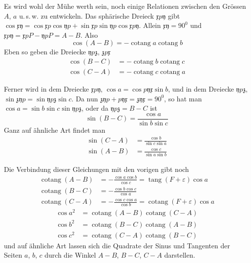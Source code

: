 %
Es wird wohl der Mühe werth sein, noch einige Relationen zwischen
den Grössen $A$, $a$ u.\,s.\,w. zu entwickeln. Das sphärische Dreieck $\mathfrak{x}p\mathfrak{y}$
gibt $\cos\mathfrak{x}\mathfrak{y}=\cos\mathfrak{x}p\cos\mathfrak{y}p+\sin\mathfrak{x}p\sin\mathfrak{y}p\cos\mathfrak{x}p\mathfrak{y}$. Allein $\mathfrak{x}\mathfrak{y}=90^0$ und
$\mathfrak{x}p\mathfrak{y}=\mathfrak{x}pP-\mathfrak{y}pP=A-B$. Also
\[
\cos(A-B)=-\operatorname{cotang}a\operatorname{cotang}b
\]
Eben so geben die Dreiecke $\mathfrak{y}p\mathfrak{z}$, $\mathfrak{z}p\mathfrak{x}$
\[
\begin{aligned}
\cos(B-C)&=-\operatorname{cotang}b\operatorname{cotang}c\\
\cos(C-A)&=-\operatorname{cotang}c\operatorname{cotang}a
\end{aligned}
\]

Ferner wird in dem Dreiecke $\mathfrak{x}p\mathfrak{y}$, $\cos a=\cos p\mathfrak{y}\mathfrak{x}\sin b$, und in dem
Dreiecke $\mathfrak{y}p\mathfrak{z}$, $\sin\mathfrak{z}\mathfrak{y}p=\sin\mathfrak{y}p\mathfrak{z}\sin c$. Da nun $\mathfrak{z}\mathfrak{y}p+p\mathfrak{y}\mathfrak{x}=\mathfrak{z}\mathfrak{y}\mathfrak{x}=90^0$,
so hat man $\cos a=\sin b\sin c\sin\mathfrak{y}p\mathfrak{z}$, oder da $\mathfrak{y}p\mathfrak{z}=B-C$ ist
\[
\sin(B-C)=\frac{\cos a}{\sin b\sin c}
\]
Ganz auf ähnliche Art findet man
\[
\begin{aligned}
\sin(C-A)&=\frac{\cos b}{\sin c\sin a}\\
\sin(A-B)&=\frac{\cos c}{\sin a\sin b}
\end{aligned}
\]

Die Verbindung dieser Gleichungen mit den vorigen gibt noch
\[
\begin{aligned}
\operatorname{cotang}(A-B)&=-\frac{\cos a\cos b}{\cos c}=\operatorname{tang}(F+\varepsilon)\cos a\\
\operatorname{cotang}(B-C)&=-\frac{\cos b\cos c}{\cos a}\\
\operatorname{cotang}(C-A)&=-\frac{\cos c\cos a}{\cos b}=\operatorname{cotang}(F+\varepsilon)\cos a
\end{aligned}
\]
\[
\begin{aligned}
\cos a^2&=\operatorname{cotang}(A-B)\operatorname{cotang}(C-A)\\
\cos b^2&=\operatorname{cotang}(B-C)\operatorname{cotang}(A-B)\\
\cos c^2&=\operatorname{cotang}(C-A)\operatorname{cotang}(B-C)
\end{aligned}
\]
und auf ähnliche Art lassen sich die Quadrate der Sinus und Tangenten der Seiten
$a$, $b$, $c$ durch die Winkel $A-B$, $B-C$, $C-A$ darstellen.

